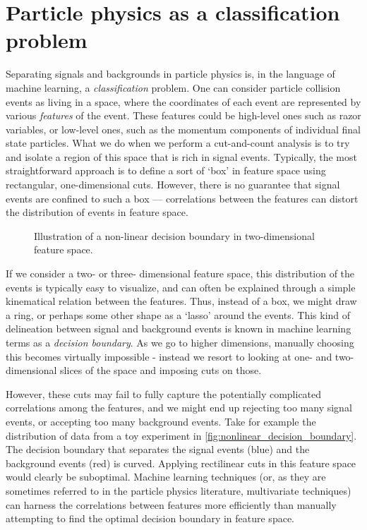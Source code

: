 \section{Particle physics as a classification problem}
Separating signals and backgrounds in particle physics is, in the language of machine learning, a \emph{classification} problem. One can consider particle collision events as living in a space, where the coordinates of each event are represented by various \emph{features} of the event. These features could be high-level ones such as razor variables, or low-level ones, such as the momentum components of individual final state particles. What we do when we perform a cut-and-count analysis is to try and isolate a region of this space that is rich in signal events. Typically, the most straightforward approach is to define a sort of `box' in feature space using rectangular, one-dimensional cuts. However, there is no guarantee that signal events are confined to such a box --- correlations between the features can distort the distribution of events in feature space. 
\strictpagecheck
\begin{figure}
  \begin{sidecaption}{Illustration of a non-linear decision boundary in two-dimensional feature space.}
  
\end{sidecaption}
\label{fig:nonlinear_decision_boundary}
\end{figure}
If we consider a two- or three- dimensional feature space, this distribution of the events is typically easy to visualize, and can often be explained through a simple kinematical relation between the features. Thus, instead of a box, we might draw a ring, or perhaps some other shape as a `lasso' around the events. This kind of delineation between signal and background events is known in machine learning terms as a \emph{decision boundary}. As we go to higher dimensions, manually choosing this becomes virtually impossible - instead we resort to looking at one- and two-dimensional slices of the space and imposing cuts on those. 

However, these cuts may fail to fully capture the potentially complicated correlations among the features, and we might end up rejecting too many signal events, or accepting too many background events. Take for example the distribution of data from a toy experiment in \autoref{fig:nonlinear_decision_boundary}. The decision boundary that separates the signal events (blue) and the background events (red) is curved. Applying rectilinear cuts in this feature space would clearly be suboptimal. Machine learning techniques (or, as they are sometimes referred to in the particle physics literature, multivariate techniques) can harness the correlations between features more efficiently than manually attempting to find the optimal decision boundary in feature space.


